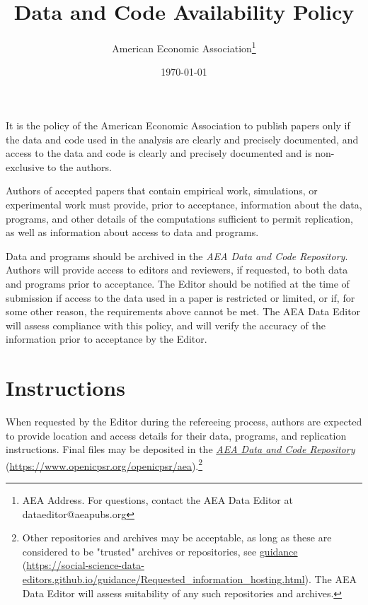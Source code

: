 \documentclass[PP]{AEA}
\newcommand{\Href}[2]{\href{#1}{#2} (\url{#1})}
\begin{document}
\title{Data and Code Availability Policy}
\author{American Economic Association\thanks{AEA Address. For questions, contact the AEA Data Editor at dataeditor@aeapubs.org}}
\date{\today}
\maketitle


It is the policy of the American Economic Association to publish papers only if the data and code used in the analysis are clearly and precisely documented, and access to the data and code is clearly and precisely documented and is non-exclusive to the authors.

Authors of accepted papers that contain empirical work, simulations, or experimental work must provide, prior to acceptance, information about the data, programs, and other details of the computations sufficient to permit replication, as well as information about access to data and programs.

Data and programs should be archived in the \textit{AEA Data and Code Repository}. Authors will provide access to editors and reviewers, if requested, to both data and programs prior to acceptance. The Editor should be notified at the time of submission if access to the data used in a paper is restricted or limited, or if, for some other reason, the requirements above cannot be met. The AEA Data Editor will assess compliance with this policy, and will verify the accuracy of the information prior to acceptance by the Editor.

\section{Instructions}

When requested by the Editor during the refereeing process, authors are expected to provide location and access details for their data, programs, and  replication instructions. Final files may be deposited in the \Href{https://www.openicpsr.org/openicpsr/aea}{\textit{AEA Data and Code Repository}}.\footnote{Other repositories and archives may be acceptable, as long as these are considered to be "trusted" archives or repositories, see \Href{https://social-science-data-editors.github.io/guidance/Requested_information_hosting.html}{guidance}. The AEA Data Editor will assess suitability of any such repositories and archives.}
\end{document}
